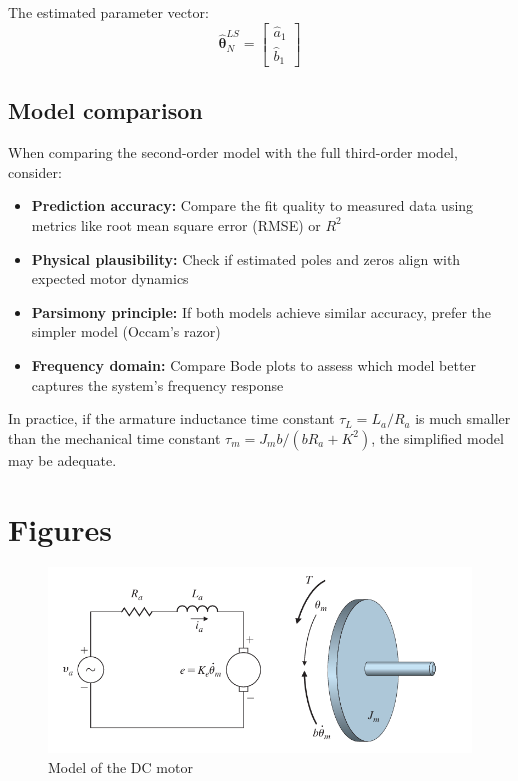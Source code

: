 \documentclass{article}
\begin{document}
	The estimated parameter vector:
	\begin{equation}
		\hat{\boldsymbol{\theta}}^{LS}_N = \begin{bmatrix}
			\hat{a}_1 \\ \hat{b}_1
		\end{bmatrix}
	\end{equation}
	
	\subsection*{Model comparison}
	
	When comparing the second-order model with the full third-order model, consider:
	\begin{itemize}
		\item \textbf{Prediction accuracy:} Compare the fit quality to measured data using metrics like root mean square error (RMSE) or $R^2$
		\item \textbf{Physical plausibility:} Check if estimated poles and zeros align with expected motor dynamics
		\item \textbf{Parsimony principle:} If both models achieve similar accuracy, prefer the simpler model (Occam's razor)
		\item \textbf{Frequency domain:} Compare Bode plots to assess which model better captures the system's frequency response
	\end{itemize}
	
	In practice, if the armature inductance time constant $\tau_L = L_a/R_a$ is much smaller than the mechanical time constant $\tau_m = J_m b / (bR_a + K^2)$, the simplified model may be adequate.

	\section{Figures}\label{app:figures}

	\begin{figure}[htbp]
		\centering
		\includegraphics[width=0.7\linewidth]{images/linear_circuit_DC.png}
		\caption{Model of the DC motor \cite{DC_motor_model}}
		\label{fig:dc_motor_model}
	\end{figure}
\end{document}

